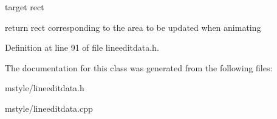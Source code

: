 target rect 

return rect corresponding to the area to be updated when animating 

Definition at line 91 of file lineeditdata.\+h.



The documentation for this class was generated from the following files\+:\begin{DoxyCompactItemize}
\item 
mstyle/lineeditdata.\+h\item 
mstyle/lineeditdata.\+cpp\end{DoxyCompactItemize}

